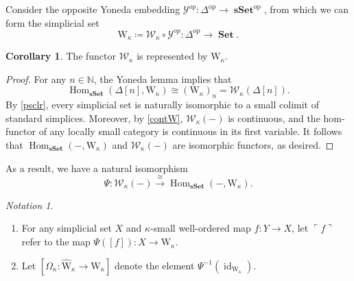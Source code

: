 \documentclass[10pt,letterpaper,cm]{nupset}
\theoremstyle{definition}
\theoremstyle{theorem}
\newtheorem{corollary}[definition]{Corollary}
\theoremstyle{remark}
\newtheorem*{notation}{Notation}
\newcommand{\0}{\mathbf{0}}
\newcommand{\1}{\mathbf{1}}
\newcommand{\2}{\mathbf{2}}
\DeclareMathOperator{\op}{op}
\DeclareMathOperator{\sset}{\mathbf{sSet}}
\DeclareMathOperator{\set}{\mathbf{Set}}
\newcommand{\N}{\mathbb N}
\DeclareMathOperator{\Hom}{Hom}
\DeclareMathOperator{\idd}{id}
\newcommand{\be}{\begin{enumerate}}
\newcommand{\ee}{\end{enumerate}}
\begin{document}
\smallskip

Consider the opposite Yoneda embedding $\mathcal{Y}^{op} : \varDelta^{\op}  \to \sset^{\op}$, from which we can form the simplicial set
\[
\mathrm{W}_{\kappa} \coloneqq \mathcal{W}_{\kappa} \circ \mathcal{Y}^{op} : \varDelta^{\op} \to \set.
\]

\begin{corollary}
The functor $\mathcal{W}_{\kappa}$ is represented by $\mathrm{W}_{\kappa}$.
\end{corollary}
\begin{proof}
For any $n\in \N$, the Yoneda lemma implies that $$\Hom_{\sset}\left(\Delta[n], \mathrm{W}_{\kappa}\right) \cong \left(\mathrm{W}_{\kappa}\right)_n = \mathcal{W}_{\kappa}\left(\Delta[n]\right).$$
By \cref{psclr}, every simplicial set is naturally isomorphic to a small colimit of standard simplices.  Moreover, by \cref{contW}, $ \mathcal{W}_{\kappa}({-})$ is continuous, and the hom-functor of any locally small category is continuous in its first variable. It follows that $\Hom_{\sset}({-}, \mathrm{W}_{\kappa})$ and $ \mathcal{W}_{\kappa}({-})$ are isomorphic functors, as desired. 
\end{proof}

As a result,  we have a natural isomorphism
\[\label{bigiso}
\Psi : \mathcal{W}_{\kappa}({-})     \overset{\cong}{\longrightarrow} \Hom_{\sset}({-}, \mathrm{W}_{\kappa}).
\tag{$\Psi$}
\]

\begin{notation} $ $
\be
\item For any simplicial set $X$ and $\kappa$-small well-ordered map  $f : Y \to X$, let $\ulcorner{f}\urcorner$ refer to the map $\Psi(\left[f\right]): X \to  \mathrm{W}_{\kappa}$.
\item Let $\left[\Omega_{\kappa} : \widehat{\mathrm{W}}_{\kappa} \to  \mathrm{W}_{\kappa} \right]$ denote the element $\Psi^{-1}\left(\idd_{\mathrm{W}_{\kappa}}\right)$.
\ee
\end{notation}
\end{document}
